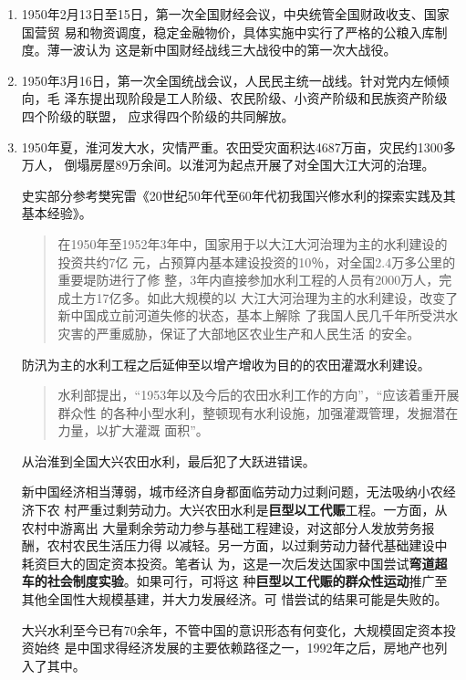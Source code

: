 \begin{enumerate}

\item 1950年2月13日至15日，第一次全国财经会议，中央统管全国财政收支、国家国营贸
  易和物资调度，稳定金融物价，具体实施中实行了严格的公粮入库制度。薄一波认为
  这是新中国财经战线三大战役中的第一次大战役。

\item 1950年3月16日，第一次全国统战会议，人民民主统一战线。针对党内左倾倾向，毛
  泽东提出现阶段是工人阶级、农民阶级、小资产阶级和民族资产阶级四个阶级的联盟，
  应求得四个阶级的共同解放。

\item 1950年夏，淮河发大水，灾情严重。农田受灾面积达4687万亩，灾民约1300多万人，
  倒塌房屋89万余间。以淮河为起点开展了对全国大江大河的治理。

  史实部分参考樊宪雷《20世纪50年代至60年代初我国兴修水利的探索实践及其基本经验》。
  \begin{quotation}
    在1950年至1952年3年中，国家用于以大江大河治理为主的水利建设的投资共约7亿
    元，占预算内基本建设投资的10％，对全国2.4万多公里的重要堤防进行了修
    整，3年内直接参加水利工程的人员有2000万人，完成土方17亿多。如此大规模的以
    大江大河治理为主的水利建设，改变了新中国成立前河道失修的状态，基本上解除
    了我国人民几千年所受洪水灾害的严重威胁，保证了大部地区农业生产和人民生活
    的安全。
  \end{quotation}

  防汛为主的水利工程之后延伸至以增产增收为目的的农田灌溉水利建设。
  \begin{quotation}
    水利部提出，“1953年以及今后的农田水利工作的方向”，“应该着重开展群众性
    的各种小型水利，整顿现有水利设施，加强灌溉管理，发掘潜在力量，以扩大灌溉
    面积”。
  \end{quotation}
  从治淮到全国大兴农田水利，最后犯了大跃进错误。

  新中国经济相当薄弱，城市经济自身都面临劳动力过剩问题，无法吸纳小农经济下农
  村严重过剩劳动力。大兴农田水利是\textbf{巨型以工代赈}工程。一方面，从农村中游离出
  大量剩余劳动力参与基础工程建设，对这部分人发放劳务报酬，农村农民生活压力得
  以减轻。另一方面，以过剩劳动力替代基础建设中耗资巨大的固定资本投资。笔者认
  为，这是一次后发达国家中国尝试\textbf{弯道超车的社会制度实验}。如果可行，可将这
  种\textbf{巨型以工代赈的群众性运动}推广至其他全国性大规模基建，并大力发展经济。可
  惜尝试的结果可能是失败的。

  大兴水利至今已有70余年，不管中国的意识形态有何变化，大规模固定资本投资始终
  是中国求得经济发展的主要依赖路径之一，1992年之后，房地产也列入了其中。


\end{enumerate}
